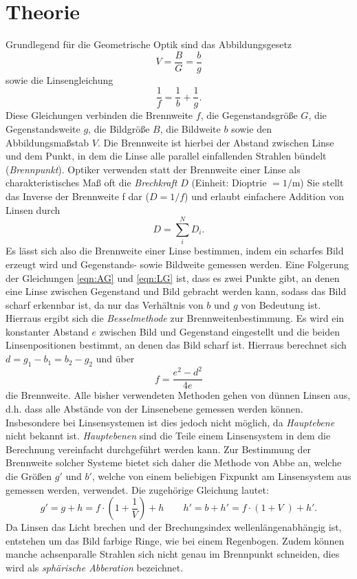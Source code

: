 \section{Theorie}
\label{sec:Theorie}
Grundlegend für die Geometrische Optik sind das Abbildungsgesetz
\begin{equation}
  V = \frac{B}{G} = \frac{b}{g}
  \label{eqn:AG}
\end{equation}
sowie die Linsengleichung
\begin{equation}
  \frac{1}{f} = \frac{1}{b} + \frac{1}{g}.
  \label{eqn:LG}
\end{equation}
Diese Gleichungen verbinden die Brennweite $f$, die Gegenstandsgröße $G$, die
Gegenstandsweite $g$, die Bildgröße $B$, die Bildweite $b$ sowie den
Abbildungsmaßstab $V$. Die Brennweite ist hierbei der Abstand zwischen Linse
und dem Punkt, in dem die Linse alle parallel einfallenden Strahlen bündelt
(\textit{Brennpunkt}).
Optiker verwenden statt der Brennweite einer Linse als charakteristisches
Maß oft die \textit{Brechkraft} $D$ (Einheit: Dioptrie $=1/\si{\meter}$)
Sie stellt das Inverse der Brennweite f dar ($D = 1/f$) und erlaubt einfachere
Addition von Linsen durch
\begin{equation}
   D =  \sum_i ^N D_i.
  \label{eqn:D}
\end{equation}
Es lässt sich also die Brennweite einer Linse bestimmen, indem ein scharfes
Bild erzeugt wird und Gegenstands- sowie Bildweite gemessen werden.
Eine Folgerung der Gleichungen \eqref{eqn:AG} und \eqref{eqn:LG} ist, dass es
zwei Punkte gibt, an denen
eine Linse zwischen Gegenstand und Bild gebracht werden kann, sodass das Bild
scharf erkennbar ist, da nur das Verhältnis von $b$ und $g$ von Bedeutung ist.
Hierraus ergibt sich die \textit{Besselmethode} zur Brennweitenbestimmung. Es
wird ein konstanter Abstand $e$ zwischen Bild und Gegenstand eingestellt und
die beiden Linsenpositionen bestimmt, an denen das Bild scharf ist. Hierraus
berechnet sich $d = g_1 -b_1 = b_2 - g_2$ und über
\begin{equation}
  f = \frac{e^2 - d^2}{4e}
  \label{eqn:bessel}
\end{equation}
die Brennweite.
Alle bisher verwendeten Methoden gehen von dünnen Linsen aus, d.h. dass alle
Abstände von der Linsenebene gemessen werden können. Insbesondere bei
Linsensystemen ist dies jedoch nicht möglich, da \textit{Hauptebene} nicht
bekannt ist. \textit{Hauptebenen} sind die Teile einem Linsensystem in dem die Berechnung
vereinfacht durchgeführt werden kann.
Zur Bestimmung der Brennweite solcher Systeme
bietet sich daher die Methode von Abbe an, welche die Größen $g'$ und $b'$,
welche von einem beliebigen Fixpunkt am Linsensystem aus gemessen werden,
verwendet. Die zugehörige Gleichung lautet:
\begin{equation}
  g' = g + h = f \cdot \left( 1 + \frac{1}{V}\right) + h
  \qquad
  h' = b + h' = f \cdot \left( 1+ V \;\right) + h'.
  \label{eqn:abbe}
\end{equation}
Da Linsen das Licht brechen und der Brechungsindex wellenlängenabhängig ist,
entstehen um das Bild farbige Ringe, wie bei einem Regenbogen. Zudem können manche
achsenparalle Strahlen sich nicht genau im Brennpunkt schneiden, dies wird als
\textit{sphärische Abberation} bezeichnet.
